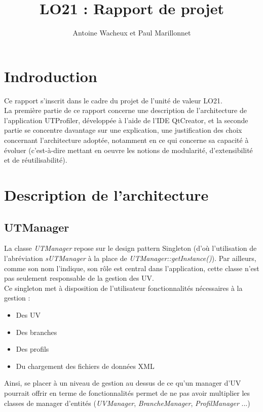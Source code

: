 \documentclass[a4paper,10pt,french]{report}
\begin{document}
\author{Antoine Wacheux et Paul Marillonnet}
\title{LO21 : Rapport de projet}\maketitle

\tableofcontents
\newpage



\section*{Indroduction}\label{sec:Introduction}

Ce rapport s'inscrit dans le cadre du projet de l'unité de valeur LO21.\\
La première partie de ce rapport concerne une description de l'architecture de l'application UTProfiler, développée à l'aide de l'IDE QtCreator, et la seconde partie se concentre davantage sur une explication, une justification des choix concernant l'architecture adoptée, notamment en ce qui concerne sa capacité à évoluer (c'est-à-dire mettant en oeuvre les notions de modularité, d'extensibilité et de réutilisabilité).

\newpage
\section{Description de l'architecture}\label{sec:I}



	\subsection{UTManager}\label{subsec:UTManager}
	
	La classe \emph{UTManager} repose sur le design pattern Singleton (d'où l'utilisation de l'abréviation \emph{sUTManager} à la place de \emph{UTManager::getInstance()}).
    Par ailleurs, comme son nom l'indique, son rôle est central dans l'application, cette classe n'est pas seulement responsable de la gestion des UV. \\
	Ce singleton met à disposition de l'utilisateur fonctionnalités nécessaires à la gestion :
	\begin{itemize}
	\item Des UV
	\item Des branches
	\item Des profils
	\item Du chargement des fichiers de données XML	
	\end{itemize}
	Ainsi, se placer à un niveau de gestion au dessus de ce qu'un manager d'UV pourrait offrir en terme de fonctionnalités permet de ne pas avoir multiplier les classes de manager d'entités (\emph{UVManager}, \emph{BrancheManager}, \emph{ProfilManager} ...)
\end{document}
